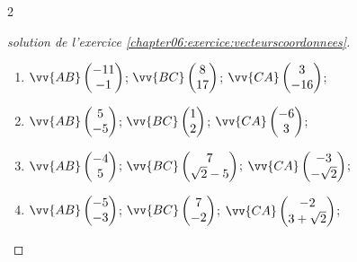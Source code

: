 \begin{multicols}{2}  
	\begin{proof}[solution de l'exercice \ref{chapter06:exercice:vecteurscoordonnees}]\hfill 
		\begin{enumerate}[leftmargin=*,label=\alph*)] 
			\item  $\vv{AB}\begin{pmatrix}
				-11\\-1
			\end{pmatrix}$;
			$\vv{BC}\begin{pmatrix}
				8\\17
			\end{pmatrix}$;
			$\vv{CA}\begin{pmatrix}
				3\\-16
			\end{pmatrix}$;
			\item  $\vv{AB}\begin{pmatrix}
				5\\-5
			\end{pmatrix}$;
			$\vv{BC}\begin{pmatrix}
				1\\2
			\end{pmatrix}$;
			$\vv{CA}\begin{pmatrix}
				-6\\3
			\end{pmatrix}$;
			\item  $\vv{AB}\begin{pmatrix}
				-4\\5
			\end{pmatrix}$;
			$\vv{BC}\begin{pmatrix}
				7\\\sqrt{2}-5
			\end{pmatrix}$;
			$\vv{CA}\begin{pmatrix}
				-3\\-\sqrt{2}
			\end{pmatrix}$;
			\item  $\vv{AB}\begin{pmatrix}
				-5\\-3
			\end{pmatrix}$;
			$\vv{BC}\begin{pmatrix}
				7\\-2
			\end{pmatrix}$;
			$\vv{CA}\begin{pmatrix}
				-2\\3+\sqrt{2}
			\end{pmatrix}$;

\end{enumerate}
\end{proof}
\end{multicols}
